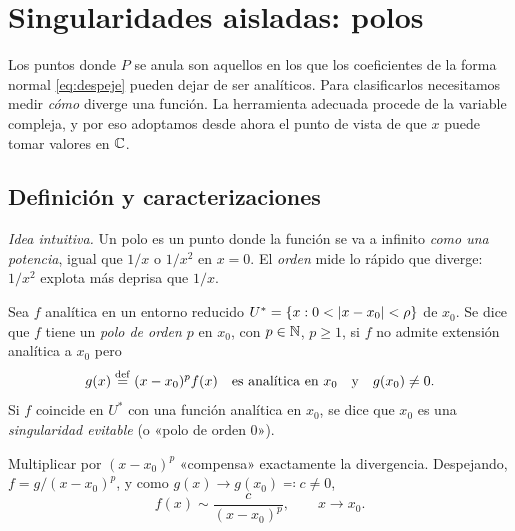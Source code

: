 \section{Singularidades aisladas: polos}\label{sec:polos}

Los puntos donde $P$ se anula son aquellos en los que los coeficientes de la
forma normal \eqref{eq:despeje} pueden dejar de ser analíticos. Para
clasificarlos necesitamos medir \emph{cómo} diverge una función. La
herramienta adecuada procede de la variable compleja, y por eso adoptamos
desde ahora el punto de vista de que $x$ puede tomar valores en $\mathbb{C}$.

\subsection{Definición y caracterizaciones}\label{sec:def-polo}

\emph{Idea intuitiva.} Un polo es un punto donde la función se va a
infinito \emph{como una potencia}, igual que $1/x$ o $1/x^{2}$ en $x=0$. El
\emph{orden} mide lo rápido que diverge: $1/x^{2}$ explota más deprisa que
$1/x$.

\begin{definicion}\label{def:polo}
Sea $f$ analítica en un entorno reducido
$U^{*}=\{x:0<\lvert x-x_0\rvert<\rho\}$ de $x_0$. Se dice que $f$ tiene un
\emph{polo de orden $p$} en $x_0$, con $p\in\mathbb{N}$, $p\ge1$, si $f$ no admite
extensión analítica a $x_0$ pero
\begin{equation}\label{eq:polo}
  g(x)\mathrel{\overset{\mathrm{def}}{=}}(x-x_0)^{p}f(x)\quad\text{es analítica en } x_0
  \quad\text{y}\quad g(x_0)\neq0 .
\end{equation}
Si $f$ coincide en $U^{*}$ con una función analítica en $x_0$, se dice que
$x_0$ es una \emph{singularidad evitable} (o «polo de orden $0$»).
\end{definicion}

Multiplicar por $(x-x_0)^p$ «compensa» exactamente la divergencia.
Despejando, $f=g/(x-x_0)^p$, y como $g(x)\to g(x_0)\eqqcolon c\neq0$,
\begin{equation}\label{eq:asintotico}
  f(x)\sim\frac{c}{(x-x_0)^{p}},\qquad x\to x_0 .
\end{equation}

